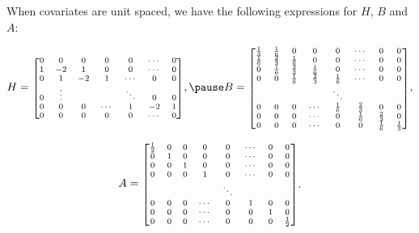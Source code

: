 \documentclass{beamer} %
\begin{document}
\begin{frame}
When covariates are unit spaced, we have the following expressions for $H$, $B$ and $A$:
\pause


\begin{equation}\label{HBA}
\begin{aligned}
H = \mbox{\scriptsize $\begin{bmatrix}
0 & 0 & 0 & 0 & 0 & \cdots & 0\\
1 & -2 & 1 & 0 & 0 & \cdots & 0\\
0 & 1 & -2 & 1 & \cdots & 0 & 0\\
0 & \vdots &  &  & \ddots & 0 & 0\\
0 & 0 & 0 & \cdots & 1 & -2 & 1\\
0 & 0 & 0 & 0 & 0 & \cdots & 0\\
\end{bmatrix}$},
\pause
B = \mbox{\scriptsize $\begin{bmatrix}
\frac{1}{3} & \frac{1}{6} & 0 & 0 & 0 & \cdots & 0 & 0\\
\frac{1}{6} & \frac{2}{3} & \frac{1}{6} & 0 & 0 & \cdots & 0 & 0\\
0 & \frac{1}{6} & \frac{2}{3} & \frac{1}{6} & 0 & \cdots & 0 & 0\\
0 & 0 & \frac{1}{6} & \frac{2}{3} & \frac{1}{6} & \cdots & 0 & 0\\
 &  &  &  & \ddots &  & & \\
 0 & 0 & 0 & \cdots & \frac{1}{6} & \frac{2}{3} & 0 & 0\\
0 & 0 & 0 & \cdots & 0 & \frac{1}{6} & \frac{2}{3} & 0\\
0 & 0 & 0 & \cdots & 0 & 0 & \frac{1}{6} & \frac{1}{3} \\
\end{bmatrix}$},
\end{aligned}
\end{equation}

\pause

\begin{equation}
\begin{aligned}
A = \mbox{\scriptsize $\begin{bmatrix}
\frac{1}{2} & 0 & 0 & 0 & 0 & \cdots & 0 & 0\\
0 & 1 & 0 & 0 & 0 & \cdots & 0 & 0\\
0 & 0 & 1 & 0 & 0 & \cdots & 0 & 0\\
0 & 0 & 0 & 1 & 0 & \cdots & 0 & 0\\
 &  &  &  & \ddots &  & & \\
 0 & 0 & 0 & \cdots & 0 & 1 & 0 & 0\\
0 & 0 & 0 & \cdots & 0 & 0 & 1 & 0\\
0 & 0 & 0 & \cdots & 0 & 0 & 0 & \frac{1}{2} \\
\end{bmatrix}$}
\end{aligned}.
\end{equation}





\pause
\end{frame}
\end{document}
